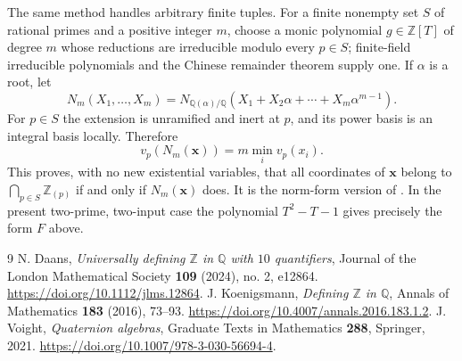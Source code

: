 \documentclass[11pt]{article}
\begin{document}
The same method handles arbitrary finite tuples. For a finite nonempty
set $S$ of rational primes and a positive integer $m$, choose a monic
polynomial $g\in\mathbb Z[T]$ of degree $m$ whose reductions are
irreducible modulo every $p\in S$; finite-field irreducible polynomials
and the Chinese remainder theorem supply one. If $\alpha$ is a root, let
\[
 N_m(X_1,\ldots,X_m)=
 N_{\mathbb Q(\alpha)/\mathbb Q}
 (X_1+X_2\alpha+\cdots+X_m\alpha^{m-1}).
\]
For $p\in S$ the extension is unramified and inert at $p$, and its
power basis is an integral basis locally. Therefore
\[
 v_p(N_m(\mathbf x))=m\min_i v_p(x_i).
\]
This proves, with no new existential variables, that all coordinates of
$\mathbf x$ belong to $\bigcap_{p\in S}\mathbb Z_{(p)}$ if and only if
$N_m(\mathbf x)$ does. It is the norm-form version of
\cite[Proposition 4.8]{Daans2024}. In the present two-prime, two-input
case the polynomial $T^2-T-1$ gives precisely the form $F$ above.


\begin{thebibliography}{9}
 N. Daans, \emph{Universally defining $\mathbb Z$
in $\mathbb Q$ with $10$ quantifiers}, Journal of the London
Mathematical Society \textbf{109} (2024), no. 2, e12864.
\url{https://doi.org/10.1112/jlms.12864}.
 J. Koenigsmann, \emph{Defining $\mathbb Z$
in $\mathbb Q$}, Annals of Mathematics \textbf{183} (2016), 73--93.
\url{https://doi.org/10.4007/annals.2016.183.1.2}.
 J. Voight, \emph{Quaternion algebras},
Graduate Texts in Mathematics \textbf{288}, Springer, 2021.
\url{https://doi.org/10.1007/978-3-030-56694-4}.
\end{thebibliography}
\end{document}
